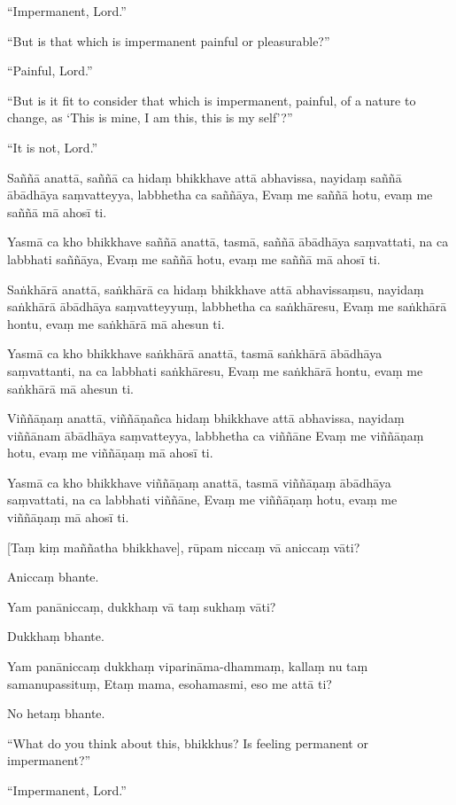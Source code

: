 ``Impermanent, Lord.''

``But is that which is impermanent painful or pleasurable?''

``Painful, Lord.''

``But is it fit to consider that which is impermanent, painful, of a
nature to change, as `This is mine, I am this, this is my self'?''

``It is not, Lord.''

\clearpage

\paliText

Saññā anattā, saññā ca hidaṃ bhikkhave attā abhavissa, nayidaṃ saññā
ābādhāya saṃvatteyya, labbhetha ca saññāya, Evaṃ me saññā hotu, evaṃ me
saññā mā ahosī ti.

Yasmā ca kho bhikkhave saññā anattā, tasmā, saññā ābādhāya saṃvattati,
na ca labbhati saññāya, Evaṃ me saññā hotu, evaṃ me saññā mā ahosī ti.

Saṅkhārā anattā, saṅkhārā ca hidaṃ bhikkhave attā abhavissaṃsu, nayidaṃ
saṅkhārā ābādhāya saṃvatteyyuṃ, labbhetha ca saṅkhāresu, Evaṃ me
saṅkhārā hontu, evaṃ me saṅkhārā mā ahesun ti.

Yasmā ca kho bhikkhave saṅkhārā anattā, tasmā saṅkhārā ābādhāya
saṃvattanti, na ca labbhati saṅkhāresu, Evaṃ me saṅkhārā hontu, evaṃ me
saṅkhārā mā ahesun ti.

Viññāṇaṃ anattā, viññāṇañca hidaṃ bhikkhave attā abhavissa, nayidaṃ
viññānam ābādhāya saṃvatteyya, labbhetha ca viññāne Evaṃ me viññāṇaṃ
hotu, evaṃ me viññāṇaṃ mā ahosī ti.

Yasmā ca kho bhikkhave viññāṇaṃ anattā, tasmā viññāṇaṃ ābādhāya
saṃvattati, na ca labbhati viññāne, Evaṃ me viññāṇaṃ hotu, evaṃ me
viññāṇaṃ mā ahosī ti.

[Taṃ kiṃ maññatha bhikkhave], rūpam niccaṃ vā aniccaṃ vāti?

Aniccaṃ bhante.

Yam panāniccaṃ, dukkhaṃ vā taṃ sukhaṃ vāti?

Dukkhaṃ bhante.

Yam panāniccaṃ dukkhaṃ viparināma-dhammaṃ, kallaṃ nu taṃ samanupassituṃ,
Etaṃ mama, esohamasmi, eso me attā ti?

No hetaṃ bhante.

\clearpage

\englishText

``What do you think about this, bhikkhus? Is feeling permanent or
impermanent?''

``Impermanent, Lord.''

